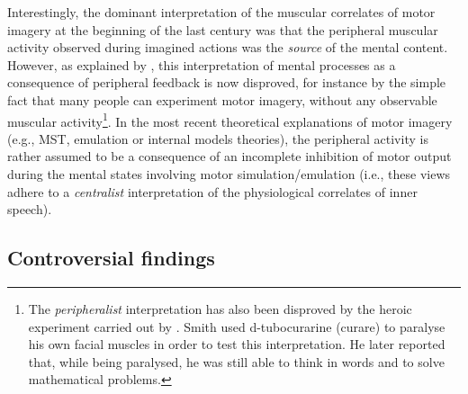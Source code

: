 \documentclass[a4paper,12pt,oneside,oldfontcommands]{memoir}
\let\rmarkdownfootnote\footnote%
\def\footnote{\protect\rmarkdownfootnote}
\begin{document}
Interestingly, the dominant interpretation of the muscular correlates of
motor imagery at the beginning of the last century was that the
peripheral muscular activity observed during imagined actions was the
\emph{source} of the mental content. However, as explained by
\citet{jeannerod_motor_2006}, this interpretation of mental processes as
a consequence of peripheral feedback is now disproved, for instance by
the simple fact that many people can experiment motor imagery, without
any observable muscular activity\footnote{The \emph{peripheralist}
  interpretation has also been disproved by the heroic experiment
  carried out by \citet{smith_lack_1947}. Smith used d-tubocurarine
  (curare) to paralyse his own facial muscles in order to test this
  interpretation. He later reported that, while being paralysed, he was
  still able to think in words and to solve mathematical problems.}. In
the most recent theoretical explanations of motor imagery (e.g., MST,
emulation or internal models theories), the peripheral activity is
rather assumed to be a consequence of an incomplete inhibition of motor
output during the mental states involving motor simulation/emulation
(i.e., these views adhere to a \emph{centralist} interpretation of the
physiological correlates of inner speech).

\subsection{Controversial findings}\label{controversial-findings}
\end{document}
